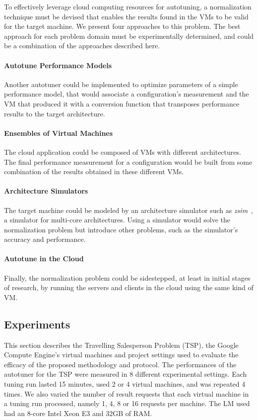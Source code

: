 To effectively leverage cloud computing resources for autotuning, a
normalization technique must be devised that enables the results found in the
VMs to be valid for the target machine.  We present four approaches to this
problem. The best approach for each problem domain must be experimentally
determined, and could be a combination of the approaches described here.

\paragraph{Autotune Performance Models}
Another autotuner could be implemented to optimize parameters of a simple
performance model, that would associate a configuration's measurement and the
VM that produced it with a conversion function that transposes
performance results to the target architecture.

\paragraph{Ensembles of Virtual Machines}
The cloud application could be composed of VMs with different architectures.
The final performance measurement for a configuration would be built from some
combination of the results obtained in these different VMs.

\paragraph{Architecture Simulators}
The target machine could be modeled by an architecture simulator such as
\emph{zsim}~\cite{sanchez2013zsim}, a simulator for multi-core architectures.
Using a simulator would solve the normalization problem but introduce other
problems, such as the simulator's accuracy and performance.

\paragraph{Autotune in the Cloud}
Finally, the normalization problem could be sidestepped, at least in initial
stages of research, by running the servers and clients in the cloud using the
same kind of VM.

\subsection{Experiments}
\label{sec:exp}

This section describes the Travelling Salesperson Problem (TSP), the Google
Compute Engine's virtual machines and project settings used to evaluate the
efficacy of the proposed methodology and protocol.  The performances of
the autotuner for the TSP were measured in 8 different
experimental settings. Each tuning run lasted 15 minutes, used 2 or 4
virtual machines, and was repeated 4 times.  We also varied the number of
result requests that each virtual machine in a tuning run processed, namely 1,
4, 8 or 16 requests per machine.
The LM used had an 8-core Intel Xeon E3 and 32GB of RAM.

